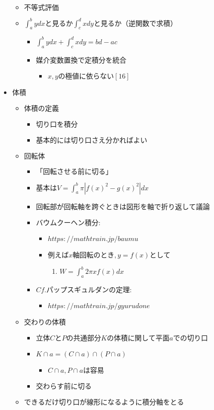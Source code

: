\documentclass[dvipdfmx,uplatex]{jsarticle}
\begin{document}
\begin{itemize}
\begin{itemize}
		\item $ 不等式評価$
		\item $ \int^b_a ydx と見るか \int^d_c xdy と見るか（逆関数で求積）$
		\begin{itemize}
			\item $ \int^b_a ydx + \int^d_c xdy = bd - ac$
			\item $ 媒介変数置換で定積分を統合$
			\begin{itemize}
				\item $ x,yの極値に依らない [16]$
			\end{itemize}
		\end{itemize}
	\end{itemize}
	\item $ 体積$
	\begin{itemize}
		\item $ 体積の定義$
		\begin{itemize}
			\item $ 切り口を積分$
			\item $ 基本的には切り口さえ分かればよい$
		\end{itemize}
		\item $ 回転体$
		\begin{itemize}
			\item $ 「回転させる前に切る」$
			\item $ 基本はV = \int^b_a \pi |f(x)^2 - g(x)^2|dx$
			\item $ 回転部が回転軸を跨ぐときは図形を軸で折り返して議論$
			\item $ バウムクーヘン積分: $
			\begin{itemize}
				\item $ https://mathtrain.jp/baumu$
				\item $ 例えばx軸回転のとき,y = f(x)として$
				\begin{enumerate}
					\item $ W = \int^b_a 2\pi xf(x)dx$
				\end{enumerate}
			\end{itemize}
			\item $ Cf. パップスギュルダンの定理: $
			\begin{itemize}
				\item $ https://mathtrain.jp/gyurudone$
			\end{itemize}
		\end{itemize}
		\item $ 交わりの体積$
		\begin{itemize}
			\item $ 立体CとPの共通部分Kの体積に関して平面aでの切り口$
			\item $ K \cap a = (C \cap a) \cap (P \cap a)$
			\begin{itemize}
				\item $ C \cap a, P \cap a は容易$
			\end{itemize}
			\item $ 交わらす前に切る$
		\end{itemize}
		\item $ できるだけ切り口が線形になるように積分軸をとる$
	\end{itemize}
\end{itemize}
\end{document}
